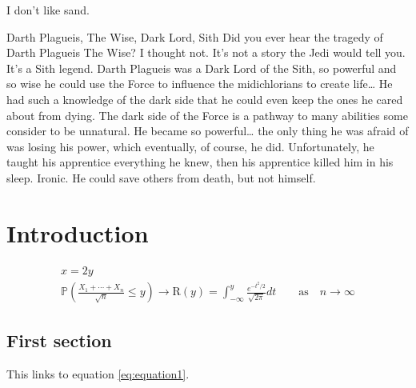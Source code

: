 \documentclass[portuguese]{ist-thesis}
\begin{document}
\makecover

\cleardoublepage

\begin{dedication}
	I don't like sand.
\end{dedication}

\begin{tabstract}{Darth Plagueis, The Wise, Dark Lord, Sith}
	Did you ever hear the tragedy of Darth Plagueis The Wise? I thought not. It's not a story the Jedi would tell you. It's a Sith legend. Darth Plagueis was a Dark Lord of the Sith, so powerful and so wise he could use the Force to influence the midichlorians to create life… He had such a knowledge of the dark side that he could even keep the ones he cared about from dying. The dark side of the Force is a pathway to many abilities some consider to be unnatural. He became so powerful… the only thing he was afraid of was losing his power, which eventually, of course, he did. Unfortunately, he taught his apprentice everything he knew, then his apprentice killed him in his sleep. Ironic. He could save others from death, but not himself.
\end{tabstract}

\tableofcontents

\cleardoublepage

\chapter{Introduction}

\begin{gather}
	x = 2y \label{eq:equation1}\\
	\mathbb{P}\left(\frac{X_1 + \cdots + X_n}{\sqrt{n}} \leq y\right) \rightarrow \mathrm{R}(y) = \int_{-\infty}^{y} \frac{e^{-t^2/2}}{\sqrt{2\pi}}dt \qquad \mathrm{as} \quad n \rightarrow \infty
\end{gather}

\section{First section}

This links to equation \ref{eq:equation1}.

\lipsum
\end{document}
